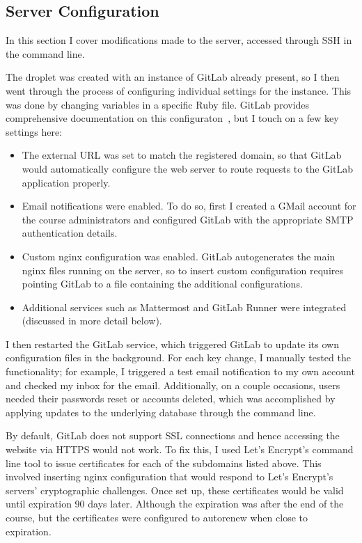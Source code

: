 \documentclass[12pt,twoside]{mitthesis}
\begin{document}
\subsection{Server Configuration}

In this section I cover modifications made to the server, accessed through SSH in the command line.

The droplet was created with an instance of GitLab already present, so I then went through the process of configuring individual settings for the instance. This was done by changing variables in a specific Ruby file. GitLab provides comprehensive documentation on this configuraton~\cite{gitlabdocs}, but I touch on a few key settings here:
\begin{itemize}
\item The external URL was set to match the registered domain, so that GitLab would automatically configure the web server to route requests to the GitLab application properly.
\item Email notifications were enabled. To do so, first I created a GMail account for the course administrators and configured GitLab with the appropriate SMTP authentication details. 
\item Custom nginx configuration was enabled. GitLab autogenerates the main nginx files running on the server, so to insert custom configuration requires pointing GitLab to a file containing the additional configurations.
\item Additional services such as Mattermost and GitLab Runner were integrated (discussed in more detail below).
\end{itemize}
I then restarted the GitLab service, which triggered GitLab to update its own configuration files in the background. For each key change, I manually tested the functionality; for example, I triggered a test email notification to my own account and checked my inbox for the email. Additionally, on a couple occasions, users needed their passwords reset or accounts deleted, which was accomplished by applying updates to the underlying database through the command line.

By default, GitLab does not support SSL connections and hence accessing the website via HTTPS would not work. To fix this, I used Let's Encrypt's command line tool to issue certificates for each of the subdomains listed above. This involved inserting nginx configuration that would respond to Let's Encrypt's servers' cryptographic challenges. Once set up, these certificates would be valid until expiration 90 days later. Although the expiration was after the end of the course, but the certificates were configured to autorenew when close to expiration. 
\end{document}
